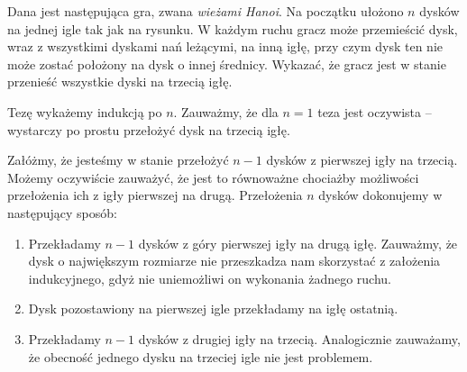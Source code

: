 \begin{problem}{3}
Dana jest następująca gra, zwana \textit{wieżami Hanoi}. Na początku ułożono $n$ dysków na jednej igle tak jak na rysunku. W każdym ruchu gracz może przemieścić dysk, wraz z wszystkimi dyskami nań leżącymi, na inną igłę, przy czym dysk ten nie może zostać położony na dysk o innej średnicy. Wykazać, że gracz jest w stanie przenieść wszystkie dyski na trzecią igłę.

\begin{center}

\end{center}

\end{problem}

\noindent
Tezę wykażemy indukcją po $n$. Zauważmy, że dla $n = 1$ teza jest oczywista -- wystarczy po prostu przełożyć dysk na trzecią igłę.

\vspace{10px}

\noindent
Załóżmy, że jesteśmy w stanie przełożyć $n - 1$ dysków z pierwszej igły na trzecią. Możemy oczywiście zauważyć, że jest to równoważne chociażby możliwości przełożenia ich z igły pierwszej na drugą.
Przełożenia $n$ dysków dokonujemy w następujący sposób:

\begin{enumerate}
	\item Przekładamy $n - 1$ dysków z góry pierwszej igły na drugą igłę. Zauważmy, że dysk o największym rozmiarze nie przeszkadza nam skorzystać z założenia indukcyjnego, gdyż nie uniemożliwi on wykonania żadnego ruchu.

	\item Dysk pozostawiony na pierwszej igle przekładamy na igłę ostatnią.

	\item Przekładamy $n - 1$ dysków z drugiej igły na trzecią. Analogicznie zauważamy, że obecność jednego dysku na trzeciej igle nie jest problemem.
\end{enumerate}

